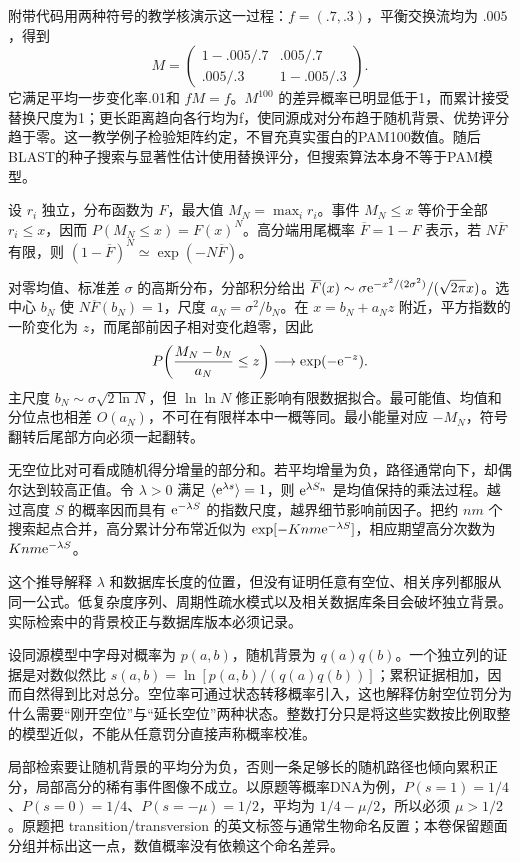 附带代码用两种符号的教学核演示这一过程：$f=(.7,.3)$，平衡交换流均为 $.005$，得到
\[
 M=\begin{pmatrix}1-.005/.7&.005/.7\\.005/.3&1-.005/.3\end{pmatrix}.
\]
它满足平均一步变化率.01和 $fM=f$。$M^{100}$ 的差异概率已明显低于1，而累计接受替换尺度为1；更长距离趋向各行均为f，使同源成对分布趋于随机背景、优势评分趋于零。这一教学例子检验矩阵约定，不冒充真实蛋白的PAM100数值。随后BLAST的种子搜索与显著性估计使用替换评分，但搜索算法本身不等于PAM模型。

设 $r_i$ 独立，分布函数为 $F$，最大值 $M_N=\max_i r_i$。事件 $M_N\le x$ 等价于全部 $r_i\le x$，因而 $P(M_N\le x)=F(x)^N$。高分端用尾概率 $\overline F=1-F$ 表示，若 $N\overline F$ 有限，则 $(1-\overline F)^N\simeq\exp(-N\overline F)$。

对零均值、标准差 $\sigma$ 的高斯分布，分部积分给出 $\overline F(x)\sim\sigma\mathrm e^{-x^2/(2\sigma^2)}/(\sqrt{2\pi}x)$。选中心 $b_N$ 使 $N\overline F(b_N)=1$，尺度 $a_N=\sigma^2/b_N$。在 $x=b_N+a_Nz$ 附近，平方指数的一阶变化为 $z$，而尾部前因子相对变化趋零，因此
\[
P\!\left(\frac{M_N-b_N}{a_N}\le z\right)\longrightarrow\exp(-\mathrm e^{-z}).
\]
主尺度 $b_N\sim\sigma\sqrt{2\ln N}$，但 $\ln\ln N$ 修正影响有限数据拟合。最可能值、均值和分位点也相差 $O(a_N)$，不可在有限样本中一概等同。最小能量对应 $-M_N$，符号翻转后尾部方向必须一起翻转。

无空位比对可看成随机得分增量的部分和。若平均增量为负，路径通常向下，却偶尔达到较高正值。令 $\lambda>0$ 满足 $\langle \mathrm e^{\lambda s}\rangle=1$，则 $\mathrm e^{\lambda S_n}$ 是均值保持的乘法过程。越过高度 $S$ 的概率因而具有 $\mathrm e^{-\lambda S}$ 的指数尺度，越界细节影响前因子。把约 $nm$ 个搜索起点合并，高分累计分布常近似为 $\exp[-Knm\mathrm e^{-\lambda S}]$，相应期望高分次数为 $Knm\mathrm e^{-\lambda S}$。

这个推导解释 $\lambda$ 和数据库长度的位置，但没有证明任意有空位、相关序列都服从同一公式。低复杂度序列、周期性疏水模式以及相关数据库条目会破坏独立背景。实际检索中的背景校正与数据库版本必须记录。

设同源模型中字母对概率为 $p(a,b)$，随机背景为 $q(a)q(b)$。一个独立列的证据是对数似然比 $s(a,b)=\ln[p(a,b)/(q(a)q(b))]$；累积证据相加，因而自然得到比对总分。空位率可通过状态转移概率引入，这也解释仿射空位罚分为什么需要“刚开空位”与“延长空位”两种状态。整数打分只是将这些实数按比例取整的模型近似，不能从任意罚分直接声称概率校准。

局部检索要让随机背景的平均分为负，否则一条足够长的随机路径也倾向累积正分，局部高分的稀有事件图像不成立。以原题等概率DNA为例，$P(s=1)=1/4$、$P(s=0)=1/4$、$P(s=-\mu)=1/2$，平均为 $1/4-\mu/2$，所以必须 $\mu>1/2$。原题把 transition/transversion 的英文标签与通常生物命名反置；本卷保留题面分组并标出这一点，数值概率没有依赖这个命名差异。

